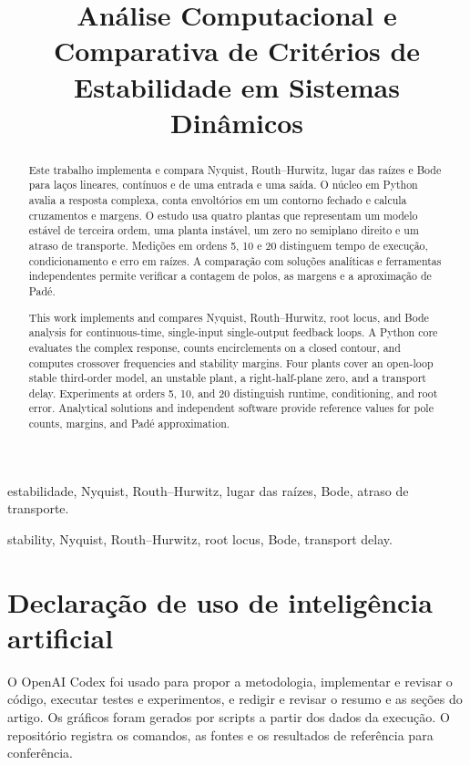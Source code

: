 \documentclass[conference]{IEEEtran}
\title{Análise Computacional e Comparativa de Critérios de Estabilidade em Sistemas Dinâmicos}
\begin{document}
\maketitle
\renewcommand{\abstractname}{Resumo}
\begin{abstract}
Este trabalho implementa e compara Nyquist, Routh--Hurwitz, lugar das raízes
e Bode para laços lineares, contínuos e de uma entrada e uma saída. O núcleo
em Python avalia a resposta complexa, conta envoltórios em um contorno fechado
e calcula cruzamentos e margens. O estudo usa quatro plantas que representam
um modelo estável de terceira ordem, uma planta instável, um zero no semiplano
direito e um atraso de transporte. Medições em ordens 5, 10 e 20 distinguem
tempo de execução, condicionamento e erro em raízes. A comparação com soluções
analíticas e ferramentas independentes permite verificar a contagem de polos,
as margens e a aproximação de Padé. 
\end{abstract}
\renewcommand{\IEEEkeywordsname}{Palavras-chave}
\begin{IEEEkeywords}
estabilidade, Nyquist, Routh--Hurwitz, lugar das raízes, Bode, atraso de transporte.
\end{IEEEkeywords}
{
\renewcommand{\abstractname}{Abstract}
\begin{abstract}
This work implements and compares Nyquist, Routh--Hurwitz, root locus, and
Bode analysis for continuous-time, single-input single-output feedback loops.
A Python core evaluates the complex response, counts encirclements on a
closed contour, and computes crossover frequencies and stability margins.
Four plants cover an open-loop stable third-order model, an unstable plant,
a right-half-plane zero, and a transport delay. Experiments at orders 5, 10,
and 20 distinguish runtime, conditioning, and root error. Analytical
solutions and independent software provide reference values for pole counts,
margins, and Padé approximation. 
\end{abstract}
\renewcommand{\IEEEkeywordsname}{Keywords}
\begin{IEEEkeywords}
stability, Nyquist, Routh--Hurwitz, root locus, Bode, transport delay.
\end{IEEEkeywords}
}




\section*{Declaração de uso de inteligência artificial}
O OpenAI Codex foi usado para propor a metodologia, implementar e
revisar o código, executar testes e experimentos, e redigir e revisar
o resumo e as seções do artigo. Os gráficos foram gerados por scripts
a partir dos dados da execução. O repositório registra os comandos,
as fontes e os resultados de referência para conferência.


\end{document}
